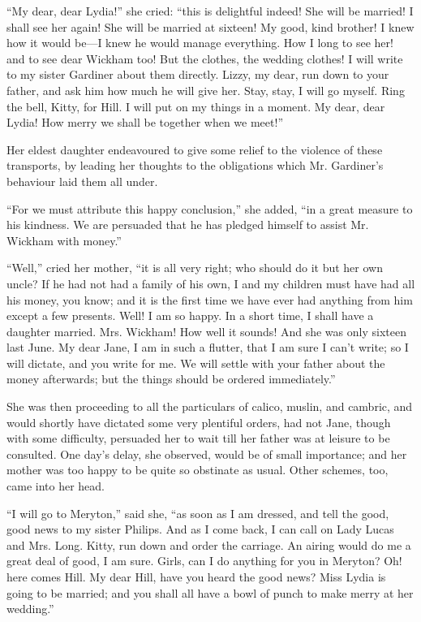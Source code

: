 ``My dear, dear Lydia!'' she cried: ``this is delightful indeed! She will be married! I shall see her again! She will be married at sixteen! My good, kind brother! I knew how it would be---I knew he would manage everything. How I long to see her! and to see dear Wickham too! But the clothes, the wedding clothes! I will write to my sister Gardiner about them directly. Lizzy, my dear, run down to your father, and ask him how much he will give her. Stay, stay, I will go myself. Ring the bell, Kitty, for Hill. I will put on my things in a moment. My dear, dear Lydia! How merry we shall be together when we meet!''

Her eldest daughter endeavoured to give some relief to the violence of these transports, by leading her thoughts to the obligations which Mr. Gardiner's behaviour laid them all under.

``For we must attribute this happy conclusion,'' she added, ``in a great measure to his kindness. We are persuaded that he has pledged himself to assist Mr. Wickham with money.''

``Well,'' cried her mother, ``it is all very right; who should do it but her own uncle? If he had not had a family of his own, I and my children must have had all his money, you know; and it is the first time we have ever had anything from him except a few presents. Well! I am so happy. In a short time, I shall have a daughter married. Mrs. Wickham! How well it sounds! And she was only sixteen last June. My dear Jane, I am in such a flutter, that I am sure I can't write; so I will dictate, and you write for me. We will settle with your father about the money afterwards; but the things should be ordered immediately.''

She was then proceeding to all the particulars of calico, muslin, and cambric, and would shortly have dictated some very plentiful orders, had not Jane, though with some difficulty, persuaded her to wait till her father was at leisure to be consulted. One day's delay, she observed, would be of small importance; and her mother was too happy to be quite so obstinate as usual. Other schemes, too, came into her head.

``I will go to Meryton,'' said she, ``as soon as I am dressed, and tell the good, good news to my sister Philips. And as I come back, I can call on Lady Lucas and Mrs. Long. Kitty, run down and order the carriage. An airing would do me a great deal of good, I am sure. Girls, can I do anything for you in Meryton? Oh! here comes Hill. My dear Hill, have you heard the good news? Miss Lydia is going to be married; and you shall all have a bowl of punch to make merry at her wedding.''

